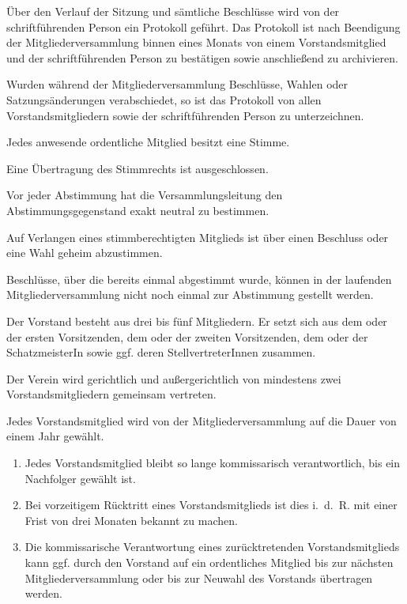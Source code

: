 \documentclass[%
    parskip=half,
]{scrartcl}
\begin{document}
\begin{contract}
		Über den Verlauf der Sitzung und sämtliche Beschlüsse wird von der schriftführenden Person ein Protokoll geführt. Das Protokoll ist nach Beendigung der Mitgliederversammlung binnen eines Monats von einem Vorstandsmitglied und der schriftführenden Person zu bestätigen sowie anschließend zu archivieren.
		
		Wurden während der Mitgliederversammlung Beschlüsse, Wahlen oder Satzungsänderungen verabschiedet, so ist das Protokoll von allen Vorstandsmitgliedern sowie der schriftführenden Person zu unterzeichnen.
		
		
		Jedes anwesende ordentliche Mitglied besitzt eine Stimme.
		
		Eine Übertragung des Stimmrechts ist ausgeschlossen.
		
		Vor jeder Abstimmung hat die Versammlungsleitung den Abstimmungsgegenstand exakt neutral zu bestimmen.
		
		Auf Verlangen eines stimmberechtigten Mitglieds ist über einen Beschluss oder eine Wahl geheim abzustimmen.
		
		Beschlüsse, über die bereits einmal abgestimmt wurde, können in der laufenden Mitgliederversammlung nicht noch einmal zur Abstimmung gestellt werden.
		
		
		Der Vorstand besteht aus drei bis fünf Mitgliedern. Er setzt sich aus dem oder der ersten Vorsitzenden, dem oder der zweiten Vorsitzenden, dem oder der SchatzmeisterIn sowie ggf. deren StellvertreterInnen zusammen.
		
		Der Verein wird gerichtlich und außergerichtlich von mindestens zwei Vorstandsmitgliedern gemeinsam vertreten.
		
		Jedes Vorstandsmitglied wird von der Mitgliederversammlung auf die Dauer von einem Jahr gewählt.
		
		\begin{enumerate}[\qquad a)]
			\item Jedes Vorstandsmitglied bleibt so lange kommissarisch verantwortlich, bis ein Nachfolger gewählt ist.
			\item Bei vorzeitigem Rücktritt eines Vorstandsmitglieds ist dies i. d. R. mit einer Frist von drei Monaten bekannt zu machen.
			\item Die kommissarische Verantwortung eines zurücktretenden Vorstandsmitglieds kann ggf. durch den Vorstand auf ein ordentliches Mitglied bis zur nächsten Mitgliederversammlung oder bis zur Neuwahl des Vorstands übertragen werden.
		\end{enumerate}
		

\end{contract}
\end{document}
